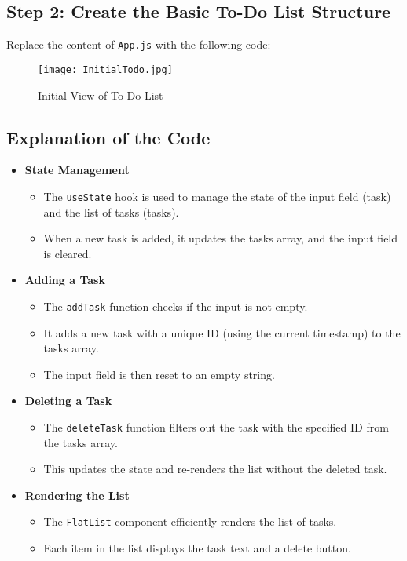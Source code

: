 \documentclass{article}
\begin{document}
\subsection{Step 2: Create the Basic To-Do List Structure}
Replace the content of \texttt{App.js} with the following code:
\begin{figure}[H]
    \centering
    \texttt{[image: InitialTodo.jpg]}
    \caption{Initial View of To-Do List}
\end{figure}


\subsection{Explanation of the Code}
\begin{itemize}
    \item \textbf{State Management}
    \begin{itemize}
        \item The \texttt{useState} hook is used to manage the state of the input field (task) and the list of tasks (tasks).
        \item When a new task is added, it updates the tasks array, and the input field is cleared.
    \end{itemize}
    
    \item \textbf{Adding a Task}
    \begin{itemize}
        \item The \texttt{addTask} function checks if the input is not empty.
        \item It adds a new task with a unique ID (using the current timestamp) to the tasks array.
        \item The input field is then reset to an empty string.
    \end{itemize}
    
    \item \textbf{Deleting a Task}
    \begin{itemize}
        \item The \texttt{deleteTask} function filters out the task with the specified ID from the tasks array.
        \item This updates the state and re-renders the list without the deleted task.
    \end{itemize}
    
    \item \textbf{Rendering the List}
    \begin{itemize}
        \item The \texttt{FlatList} component efficiently renders the list of tasks.
        \item Each item in the list displays the task text and a delete button.
    \end{itemize}
\end{itemize}
\end{document}
